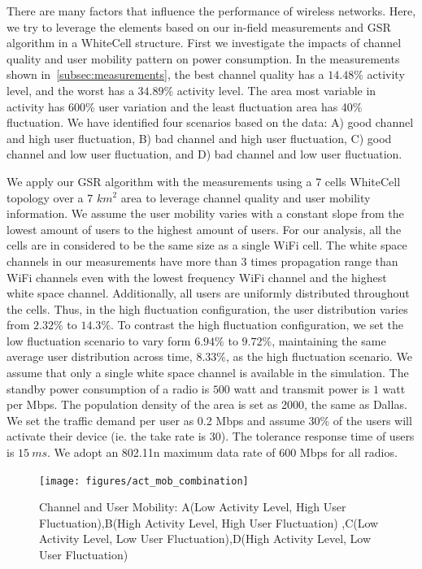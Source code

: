 There are many factors that influence the performance of wireless networks. 
Here, we try to leverage the elements based on our in-field measurements and GSR algorithm in a WhiteCell structure.
First we investigate the impacts of channel quality and user mobility pattern on power consumption.
In the measurements shown in~\ref{subsec:measurements}, the best channel quality has a $14.48\%$ activity level, and the worst has a $34.89\%$ activity level. 
The area most variable in activity has 600\% user variation and the least fluctuation area has 40\% fluctuation. 
We have identified four scenarios based on the data: A) good channel and high user fluctuation, B) bad channel and high user fluctuation, C) good channel and low user fluctuation, and D) bad channel and low user fluctuation.

We apply our GSR algorithm with the measurements using a 7 cells WhiteCell topology over a 7 $km^2$ area to leverage channel quality and user mobility information.
We assume the user mobility varies with a constant slope from the lowest amount of users to the highest amount of users. 
For our analysis, all the cells are in considered to be the same size as a single WiFi cell. 
The white space channels in our measurements have more than 3 times propagation range than WiFi channels even with the lowest frequency WiFi channel and the highest white space channel.
Additionally, all users are uniformly distributed throughout the cells. 
Thus, in the high fluctuation configuration, the user distribution varies from $2.32\%$ to $14.3\%$. 
To contrast the high fluctuation configuration, we set the low fluctuation scenario to vary form $6.94\%$ to $9.72\%$, maintaining the same average user distribution across time, $8.33\%$, as the high fluctuation scenario. 
We assume that only a single white space channel is available in the simulation.
The standby power consumption of a radio is $500$ watt and transmit power is $1$ watt per Mbps.
The population density of the area is set as 2000, the same as Dallas.
We set the traffic demand per user as 0.2 Mbps and assume 30\% of the users will activate their device (ie. the take rate is 30). 
The tolerance response time of users is $15\ ms$. 
We adopt an 802.11n maximum data rate of 600 Mbps for all radios. 


\begin{figure}
\vspace{-0.0in}
\centering
\texttt{[image: figures/act\_mob\_combination]}
\vspace{-0.1in}
\caption{Channel and User Mobility: A(Low Activity Level, High User Fluctuation),B(High Activity Level, High User Fluctuation)
,C(Low Activity Level, Low User Fluctuation),D(High Activity Level, Low User Fluctuation)}
\label{fig:act_mob_combination}
\vspace{-0.1in}
\end{figure}

